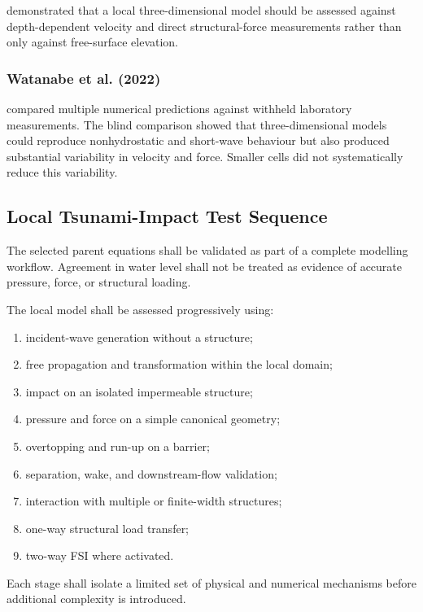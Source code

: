 \textcite{qin2018comparison} demonstrated that a local
three-dimensional model should be assessed against depth-dependent
velocity and direct structural-force measurements rather than only
against free-surface elevation.

\subsubsection{Watanabe et al. (2022)}
\label{sec:res-ver-tst-evidence-watanabe-2022}

\textcite{watanabe2022validation} compared multiple numerical
predictions against withheld laboratory measurements. The blind
comparison showed that three-dimensional models could reproduce
nonhydrostatic and short-wave behaviour but also produced substantial
variability in velocity and force. Smaller cells did not systematically
reduce this variability.

\subsection{Local Tsunami-Impact Test Sequence}
\label{sec:res-ver-tst-local-impact-sequence}

The selected parent equations shall be validated as part of a complete
modelling workflow. Agreement in water level shall not be treated as
evidence of accurate pressure, force, or structural loading.

The local model shall be assessed progressively using:

\begin{enumerate}
  \item incident-wave generation without a structure;
  \item free propagation and transformation within the local domain;
  \item impact on an isolated impermeable structure;
  \item pressure and force on a simple canonical geometry;
  \item overtopping and run-up on a barrier;
  \item separation, wake, and downstream-flow validation;
  \item interaction with multiple or finite-width structures;
  \item one-way structural load transfer;
  \item two-way FSI where activated.
\end{enumerate}

Each stage shall isolate a limited set of physical and numerical
mechanisms before additional complexity is introduced.

